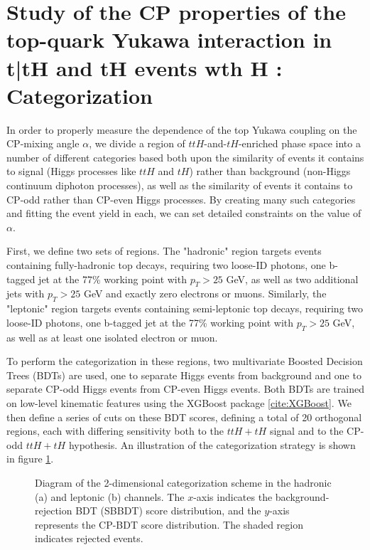 \section{Study of the CP properties of the top-quark Yukawa interaction in t\bar{t}H and tH events wth H \rightarrow \gamma \gamma: Categorization} \label{sec:ttHCPCategorization}

In order to properly measure the dependence of the top Yukawa coupling on the CP-mixing angle $\alpha$, we divide a region of $ttH$-and-$tH$-enriched phase space into a number of different categories based both upon the similarity of events it contains to signal (Higgs processes like $ttH$ and $tH$) rather than background (non-Higgs continuum diphoton processes), as well as the similarity of events it contains to CP-odd rather than CP-even Higgs processes. By creating many such categories and fitting the event yield in each, we can set detailed constraints on the value of $\alpha$.

First, we define two sets of regions. The "hadronic" region targets events containing fully-hadronic top decays, requiring two loose-ID photons, one b-tagged jet at the 77\% working point with $p_{T} > 25$ GeV, as well as two additional jets with $p_{T} > 25$ GeV and exactly zero electrons or muons. Similarly, the "leptonic" region targets events containing semi-leptonic top decays, requiring two loose-ID photons, one b-tagged jet at the 77\% working point with $p_{T} > 25$ GeV, as well as at least one isolated electron or muon.

To perform the categorization in these regions, two multivariate Boosted Decision Trees (BDTs) are used, one to separate Higgs events from background and one to separate CP-odd Higgs events from CP-even Higgs events. Both BDTs are trained on low-level kinematic features using the XGBoost package \ref{cite:XGBoost}. We then define a series of cuts on these BDT scores, defining a total of 20 orthogonal regions, each with differing sensitivity both to the $ttH+tH$ signal and to the CP-odd $ttH+tH$ hypothesis. An illustration of the categorization strategy is shown in figure \ref{fig:cartoon}.

\begin{figure}[htbp]
  \centering
  \caption{Diagram of the 2-dimensional categorization scheme in the hadronic (a) and leptonic (b) channels. The $x$-axis indicates the background-rejection BDT (SBBDT) score distribution, and the $y$-axis represents the CP-BDT score distribution. The shaded region indicates rejected events.}
  \label{fig:cartoon}
\end{figure}

